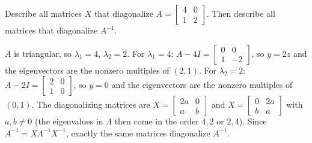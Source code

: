 \begin{exercise}\label{exr:u24-allX}
Describe all matrices $X$ that diagonalize
$A=\left[\begin{smallmatrix} 4&0\\ 1&2\end{smallmatrix}\right]$. Then describe all matrices
that diagonalize $A^{-1}$.
\end{exercise}
\begin{solution}
$A$ is triangular, so $\lambda_1=4$, $\lambda_2=2$. For $\lambda_1=4$:
$A-4I=\left[\begin{smallmatrix} 0&0\\ 1&-2\end{smallmatrix}\right]$, so $y=2z$ and the
eigenvectors are the nonzero multiples of $(2,1)$. For $\lambda_2=2$:
$A-2I=\left[\begin{smallmatrix} 2&0\\ 1&0\end{smallmatrix}\right]$, so $y=0$ and the
eigenvectors are the nonzero multiples of $(0,1)$. The diagonalizing matrices are
$X=\left[\begin{smallmatrix} 2a&0\\ a&b\end{smallmatrix}\right]$ and
$X=\left[\begin{smallmatrix} 0&2a\\ b&a\end{smallmatrix}\right]$ with $a,b\neq0$ (the
eigenvalues in $\Lambda$ then come in the order $4,2$ or $2,4$). Since
$A^{-1}=X\Lambda^{-1}X^{-1}$, exactly the same matrices diagonalize $A^{-1}$.
\end{solution}

